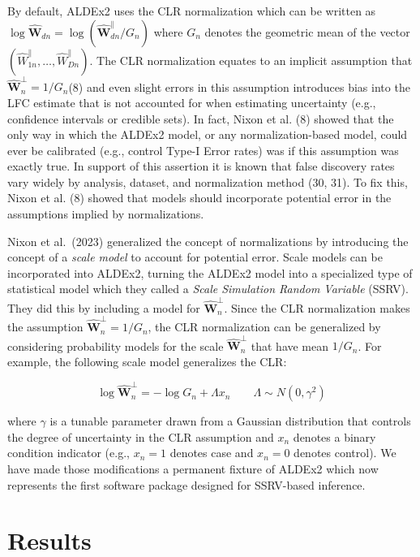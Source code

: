 \documentclass[
]{article}
\begin{document}
By default, ALDEx2 uses the CLR normalization which can be written as
\(\log \mathbf{\hat{W}}_{dn}=\log (\mathbf{\hat{W}}^{\parallel}_{dn}/G_{n})\)
where \(G_{n}\) denotes the geometric mean of the vector
\((\hat{W}^{\parallel}_{1n}, \dots, \hat{W}^{\parallel}_{Dn})\). The CLR
normalization equates to an implicit assumption that
\(\mathbf{\hat{W}}^{\perp}_{n}=1/G_{n}\)(8) and even slight errors in
this assumption introduces bias into the LFC estimate that is not
accounted for when estimating uncertainty (e.g., confidence intervals or
credible sets). In fact, Nixon et al. (8) showed that the only way in
which the ALDEx2 model, or any normalization-based model, could ever be
calibrated (e.g., control Type-I Error rates) was if this assumption was
exactly true. In support of this assertion it is known that false
discovery rates vary widely by analysis, dataset, and normalization
method (30, 31). To fix this, Nixon et al. (8) showed that models should
incorporate potential error in the assumptions implied by
normalizations.

Nixon et al.~(2023) generalized the concept of normalizations by
introducing the concept of a \textit{scale model} to account for
potential error. Scale models can be incorporated into ALDEx2, turning
the ALDEx2 model into a specialized type of statistical model which they
called a \textit{Scale Simulation Random   Variable} (SSRV). They did
this by including a model for \(\mathbf{\hat{W}}^{\perp}_{n}\). Since
the CLR normalization makes the assumption
\(\mathbf{\hat{W}}^{\perp}_{n}=1/G_{n}\), the CLR normalization can be
generalized by considering probability models for the scale
\(\mathbf{\hat{W}}^{\perp}_{n}\) that have mean \(1/G_{n}\). For
example, the following scale model generalizes the CLR:

\[\log \mathbf{\hat{W}}^{\perp}_{n} = -\log G_{n} + \Lambda x_{n} \qquad \Lambda \sim N(0, \gamma^{2})\]

where \(\gamma\) is a tunable parameter drawn from a Gaussian
distribution that controls the degree of uncertainty in the CLR
assumption and \(x_{n}\) denotes a binary condition indicator (e.g.,
\(x_{n}=1\) denotes case and \(x_{n}=0\) denotes control). We have made
those modifications a permanent fixture of ALDEx2 which now represents
the first software package designed for SSRV-based inference.

\section{Results}\label{results}
\end{document}
